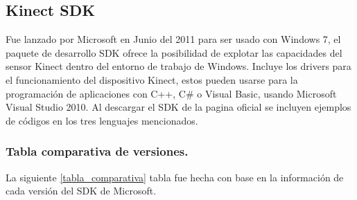 \documentclass[11pt,a4paper]{article}
\begin{document}
\subsection{Kinect SDK}
Fue lanzado por Microsoft en Junio del 2011 para ser usado con Windows 7, el paquete de desarrollo SDK ofrece la posibilidad de explotar las capacidades del sensor Kinect dentro del entorno de trabajo de Windows. Incluye los drivers para el funcionamiento del dispositivo Kinect, estos pueden usarse para la programación de aplicaciones con C++, C\# o Visual Basic, usando Microsoft Visual Studio 2010. Al descargar el SDK de la pagina oficial se incluyen ejemplos de códigos en los tres lenguajes mencionados.
\subsubsection{Tabla comparativa de versiones.}
La siguiente \ref{tabla_comparativa} tabla fue hecha con base en la información de cada versión del SDK de Microsoft.
\newline
\newline
\end{document}
